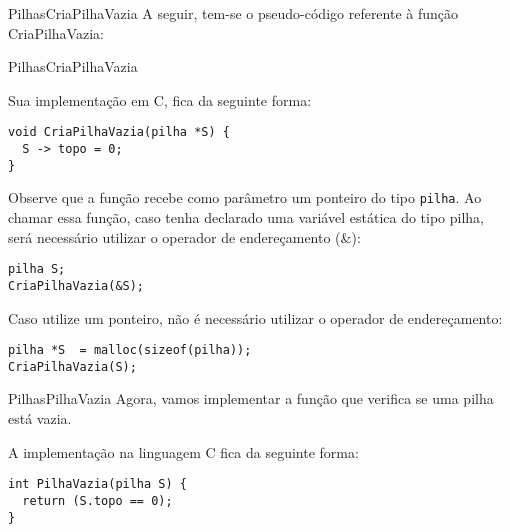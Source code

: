 \documentclass[aspectratio=169]{beamer}
\begin{document}

\begin{frame}[fragile]	{Pilhas}{CriaPilhaVazia}
A seguir, tem-se o pseudo-código referente à função CriaPilhaVazia:
\begin{algorithm}[H]
\caption{CriaPilhaVazia} 
\label{CriaPilhaVazia}
\end{algorithm}
\end{frame}


\begin{frame}[fragile]{Pilhas}{CriaPilhaVazia}

Sua implementação em C, fica da seguinte forma:
\begin{lstlisting}[style=CStyle]
void CriaPilhaVazia(pilha *S) { 
  S -> topo = 0; 
} 
\end{lstlisting}  
Observe que a função recebe como parâmetro um ponteiro do tipo \verb|pilha|. Ao chamar essa função, caso tenha declarado uma variável estática do tipo pilha, será necessário utilizar o operador de endereçamento (\&):

\begin{lstlisting}[style=CStyle]
pilha S;
CriaPilhaVazia(&S);
\end{lstlisting}  
Caso utilize um ponteiro, não é necessário utilizar o operador de endereçamento:
\begin{lstlisting}[style=CStyle]
pilha *S  = malloc(sizeof(pilha));
CriaPilhaVazia(S);
\end{lstlisting}  
\end{frame}



\begin{frame}[fragile]{Pilhas}{PilhaVazia}
Agora, vamos implementar a função que verifica se uma pilha está vazia.


A implementação na linguagem C fica da seguinte forma:

\begin{lstlisting}[style=CStyle]
int PilhaVazia(pilha S) { 
  return (S.topo == 0); 
} 
\end{lstlisting}  
\end{frame}
\end{document}
